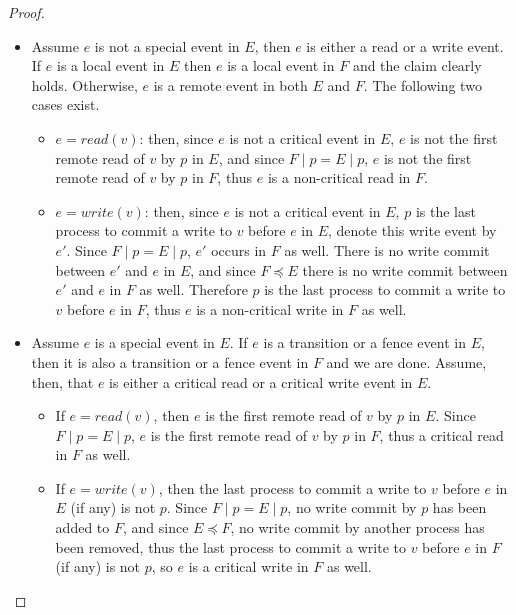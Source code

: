 \begin{proof}
	$ $
	
\begin{itemize}
	\item Assume $e$ is not a special event in $E$, then $e$ is either a read or a write event.
	\\ If $e$ is a local event in $E$ then $e$ is a local event in $F$ and the claim clearly holds. Otherwise, $e$ is a remote event in both $E$ and $F$. The following two cases exist.
\begin{itemize}
\item $e = read(v)$: then, since $e$ is not a critical event in $E$, $e$ is not the first remote read of $v$ by $p$ in $E$, and since $F \mid p = E \mid p$, $e$ is not the first remote read of $v$ by $p$ in $F$, thus $e$ is a non-critical read in $F$.
\item $e = write(v)$: then, since $e$ is not a critical event in $E$, $p$ is the last process to commit a write to $v$ before $e$ in $E$, denote this write event by $e'$. Since $F \mid p = E \mid p$, $e'$ occurs in $F$ as well. There is no write commit between $e'$ and $e$ in $E$, and since $F \preceq E$ there is no write commit between $e'$ and $e$ in $F$ as well. Therefore $p$ is the last process to commit a write to $v$ before $e$ in $F$, thus $e$ is a non-critical write in $F$ as well.
\end{itemize}
	
	\item Assume $e$ is a special event in $E$. If $e$ is a transition or a fence event in $E$, then it is also a transition or a fence event in $F$ and we are done. Assume, then, that $e$ is either a critical read or a critical write event in $E$.
\begin{itemize}

\item If $e = read(v)$, then $e$ is the first remote read of $v$ by $p$ in $E$. Since $F \mid p = E \mid p$, $e$ is the first remote read of $v$ by $p$ in $F$, thus a critical read in $F$ as well.
\item If $e = write(v)$, then the last process to commit a write to $v$ before $e$ in $E$ (if any) is not $p$. Since $F \mid p = E \mid p$, no write commit by $p$ has been added to $F$, and since $E \preceq F$, no write commit by another process has been removed, thus the last process to commit a write to $v$ before $e$ in $F$ (if any) is not $p$, so $e$ is a critical write in $F$ as well.
\end{itemize}
\end{itemize}
\end{proof}

